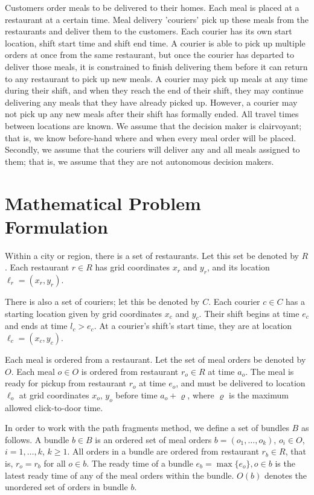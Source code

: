 \documentclass{article}
\begin{document}
Customers order meals to be delivered to their homes. Each meal is placed at a restaurant at a certain time. Meal delivery 'couriers' pick up these meals from the restaurants and deliver them to the customers. Each courier has its own start location, shift start time and shift end time. A courier is able to pick up multiple orders at once from the same restaurant, but once the courier has departed to deliver those meals, it is constrained to finish delivering them before it can return to any restaurant to pick up new meals. A courier may pick up meals at any time during their shift, and when they reach the end of their shift, they may continue delivering any meals that they have already picked up. However, a courier may not pick up any new meals after their shift has formally ended. All travel times between locations are known. We assume that the decision maker is clairvoyant; that is, we know before-hand where and when every meal order will be placed. Secondly, we assume that the couriers will deliver any and all meals assigned to them; that is, we assume that they are not autonomous decision makers.

\section{Mathematical Problem Formulation}

Within a city or region, there is a set of restaurants. Let this set be denoted by $R$. Each restaurant $r\in R$ has grid coordinates $x_r$ and $y_r$, and its location $\ell_r=(x_r, y_r)$.

There is also a set of couriers; let this be denoted by $C$. Each courier $c\in C$ has a starting location given by grid coordinates $x_c$ and $y_c$. Their shift begins at time $e_c$ and ends at time $l_c>e_c$. At a courier's shift's start time, they are at location $\ell_c=(x_c, y_c)$.

Each meal is ordered from a restaurant. Let the set of meal orders be denoted by $O$. Each meal $o\in O$ is ordered from restaurant $r_o\in R$ at time $a_o$. The meal is ready for pickup from restaurant $r_o$ at time $e_o$, and must be delivered to location $\ell_o$ at grid coordinates $x_o$, $y_o$ before time $a_o+\varrho$, where $\varrho$ is the maximum allowed click-to-door time.

In order to work with the path fragments method, we define a set of bundles $B$ as follows. A bundle $b\in B$ is an ordered set of meal orders $b=(o_1, \dots, o_k)$, $o_i\in O$, $i=1,\dots,k$, $k\geq 1$. All orders in a bundle are ordered from restaurant $r_b\in R$, that is, $r_o=r_b$ for all $o\in b$. The ready time of a bundle $e_b=\max\{e_o\}, o\in b$ is the latest ready time of any of the meal orders within the bundle. $O(b)$ denotes the unordered set of orders in bundle $b$.
\end{document}
